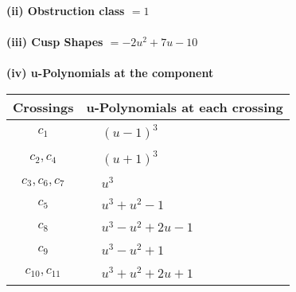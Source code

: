 \documentclass[1p]{elsarticle_modified}
\theoremstyle{definition}
\begin{document}
\flushleft \textbf{(ii) Obstruction class $= 1$}\\~\\
\flushleft \textbf{(iii) Cusp Shapes $= -2 u^2+7 u-10$}\\~\\
\newpage\renewcommand{\arraystretch}{1}
\flushleft \textbf{(iv) u-Polynomials at the component}\newline \\
\begin{tabular}{m{50pt}|m{274pt}}
Crossings & \hspace{64pt}u-Polynomials at each crossing \\
\hline $$\begin{aligned}c_{1}\end{aligned}$$&$\begin{aligned}
&(u-1)^3
\end{aligned}$\\
\hline $$\begin{aligned}c_{2},c_{4}\end{aligned}$$&$\begin{aligned}
&(u+1)^3
\end{aligned}$\\
\hline $$\begin{aligned}c_{3},c_{6},c_{7}\end{aligned}$$&$\begin{aligned}
&u^3
\end{aligned}$\\
\hline $$\begin{aligned}c_{5}\end{aligned}$$&$\begin{aligned}
&u^3+u^2-1
\end{aligned}$\\
\hline $$\begin{aligned}c_{8}\end{aligned}$$&$\begin{aligned}
&u^3- u^2+2 u-1
\end{aligned}$\\
\hline $$\begin{aligned}c_{9}\end{aligned}$$&$\begin{aligned}
&u^3- u^2+1
\end{aligned}$\\
\hline $$\begin{aligned}c_{10},c_{11}\end{aligned}$$&$\begin{aligned}
&u^3+u^2+2 u+1
\end{aligned}$\\
\hline
\end{tabular}\\~\\
\end{document}
